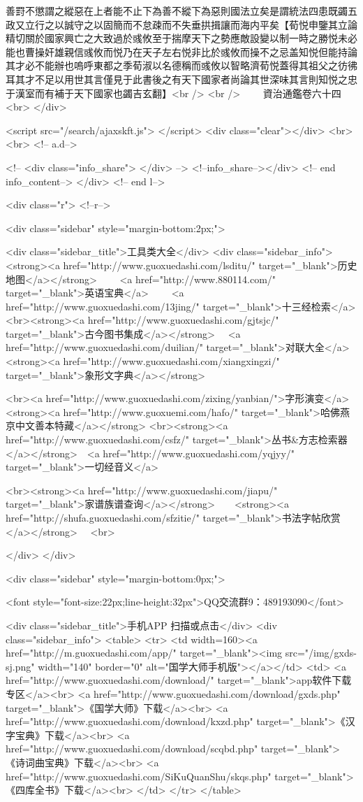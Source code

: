 善罸不懲謂之縱惡在上者能不止下為善不縱下為惡則國法立矣是謂統法四患既蠲五政又立行之以誠守之以固簡而不怠疎而不失垂拱揖讓而海内平矣【荀悦申鑒其立論精切關於國家興亡之大致過於彧攸至于揣摩天下之勢應敵設變以制一時之勝悦未必能也曹操奸雄親信彧攸而悦乃在天子左右悦非比於彧攸而操不之忌盖知悦但能持論其才必不能辦也嗚呼東都之季荀淑以名德稱而彧攸以智略濟荀悦蓋得其祖父之彷彿耳其才不足以用世其言僅見于此書後之有天下國家者尚論其世深味其言則知悦之忠于漢室而有補于天下國家也蠲吉玄翻】<br />
<br />
　　資治通鑑卷六十四  <br>
   </div> 

<script src="/search/ajaxskft.js"> </script>
 <div class="clear"></div>
<br>
<br>
 <!-- a.d-->

 <!--
<div class="info_share">
</div> 
-->
 <!--info_share--></div>   <!-- end info_content-->
  </div> <!-- end l-->

<div class="r">   <!--r-->



<div class="sidebar"  style="margin-bottom:2px;">

 
<div class="sidebar_title">工具类大全</div>
<div class="sidebar_info">
<strong><a href="http://www.guoxuedashi.com/lsditu/" target="_blank">历史地图</a></strong>　　
<a href="http://www.880114.com/" target="_blank">英语宝典</a>　　
<a href="http://www.guoxuedashi.com/13jing/" target="_blank">十三经检索</a>　
<br><strong><a href="http://www.guoxuedashi.com/gjtsjc/" target="_blank">古今图书集成</a></strong>　
<a href="http://www.guoxuedashi.com/duilian/" target="_blank">对联大全</a>　<strong><a href="http://www.guoxuedashi.com/xiangxingzi/" target="_blank">象形文字典</a></strong>　

<br><a href="http://www.guoxuedashi.com/zixing/yanbian/">字形演变</a>　　<strong><a href="http://www.guoxuemi.com/hafo/" target="_blank">哈佛燕京中文善本特藏</a></strong>
<br><strong><a href="http://www.guoxuedashi.com/csfz/" target="_blank">丛书&方志检索器</a></strong>　<a href="http://www.guoxuedashi.com/yqjyy/" target="_blank">一切经音义</a>　　

<br><strong><a href="http://www.guoxuedashi.com/jiapu/" target="_blank">家谱族谱查询</a></strong>　　<strong><a href="http://shufa.guoxuedashi.com/sfzitie/" target="_blank">书法字帖欣赏</a></strong>　
<br>

</div>
</div>


<div class="sidebar" style="margin-bottom:0px;">

<font style="font-size:22px;line-height:32px">QQ交流群9：489193090</font>


<div class="sidebar_title">手机APP 扫描或点击</div>
<div class="sidebar_info">
<table>
<tr>
	<td width=160><a href="http://m.guoxuedashi.com/app/" target="_blank"><img src="/img/gxds-sj.png" width="140"  border="0" alt="国学大师手机版"></a></td>
	<td>
<a href="http://www.guoxuedashi.com/download/" target="_blank">app软件下载专区</a><br>
<a href="http://www.guoxuedashi.com/download/gxds.php" target="_blank">《国学大师》下载</a><br>
<a href="http://www.guoxuedashi.com/download/kxzd.php" target="_blank">《汉字宝典》下载</a><br>
<a href="http://www.guoxuedashi.com/download/scqbd.php" target="_blank">《诗词曲宝典》下载</a><br>
<a href="http://www.guoxuedashi.com/SiKuQuanShu/skqs.php" target="_blank">《四库全书》下载</a><br>
</td>
</tr>
</table>


